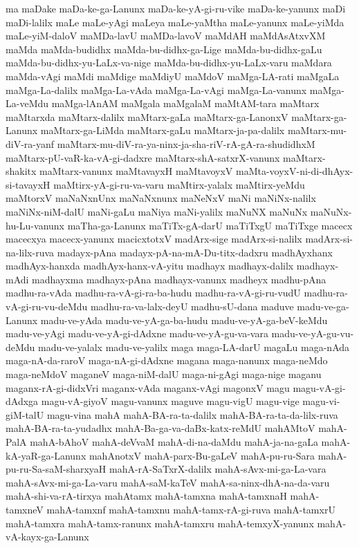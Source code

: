 {ma
maDake
maDa-ke-ga-Lanunx
maDa-ke-yA-gi-ru-vike
maDa-ke-yanunx
maDi
maDi-lalilx
maLe
maLe-yAgi
maLeya
maLe-yaMtha
maLe-yanunx
maLe-yiMda
maLe-yiM-daloV
maMDa-lavU
maMDa-lavoV
maMdAH
maMdAsAtxvXM
maMda
maMda-budidhx
maMda-bu-didhx-ga-Lige
maMda-bu-didhx-gaLu
maMda-bu-didhx-yu-LaLx-va-nige
maMda-bu-didhx-yu-LaLx-varu
maMdara
maMda-vAgi
maMdi
maMdige
maMdiyU
maMdoV
maMga-LA-rati
maMgaLa
maMga-La-dalilx
maMga-La-vAda
maMga-La-vAgi
maMga-La-vanunx
maMga-La-veMdu
maMga-lAnAM
maMgala
maMgalaM
maMtAM-tara
maMtarx
maMtarxda
maMtarx-dalilx
maMtarx-gaLa
maMtarx-ga-LanonxV
maMtarx-ga-Lanunx
maMtarx-ga-LiMda
maMtarx-gaLu
maMtarx-ja-pa-dalilx
maMtarx-mu-diV-ra-yanf
maMtarx-mu-diV-ra-ya-ninx-ja-sha-riV-rA-gA-ra-shudidhxM
maMtarx-pU-vaR-ka-vA-gi-dadxre
maMtarx-shA-satxrX-vanunx
maMtarx-shakitx
maMtarx-vanunx
maMtavayxH
maMtavoyxV
maMta-voyxV-ni-di-dhAyx-si-tavayxH
maMtirx-yA-gi-ru-va-varu
maMtirx-yalalx
maMtirx-yeMdu
maMtorxV
maNaNxnUnx
maNaNxnunx
maNeNxV
maNi
maNiNx-nalilx
maNiNx-niM-dalU
maNi-gaLu
maNiya
maNi-yalilx
maNuNX
maNuNx
maNuNx-hu-Lu-vanunx
maTha-ga-Lanunx
maTiTx-gA-darU
maTiTxgU
maTiTxge
macecx
macecxya
macecx-yanunx
macicxtotxV
madArx-sige
madArx-si-nalilx
madArx-si-na-lilx-ruva
madayx-pAna
madayx-pA-na-mA-Du-titx-dadxru
madhAyxhanx
madhAyx-hanxda
madhAyx-hanx-vA-yitu
madhayx
madhayx-dalilx
madhayx-mAdi
madhayxma
madhayx-pAna
madhayx-vanunx
madheyx
madhu-pAna
madhu-ra-vAda
madhu-ra-vA-gi-ra-ba-hudu
madhu-ra-vA-gi-ru-vudU
madhu-ra-vA-gi-ru-vu-deMdu
madhu-ra-va-lalx-deyU
madhu-sU-dana
maduve
madu-ve-ga-Lanunx
madu-ve-yAda
madu-ve-yA-ga-ba-hudu
madu-ve-yA-ga-beV-keMdu
madu-ve-yAgi
madu-ve-yA-gi-dAdxne
madu-ve-yA-gu-va-vara
madu-ve-yA-gu-vu-deMdu
madu-ve-yalalx
madu-ve-yalilx
maga
maga-LA-darU
magaLu
maga-nAda
maga-nA-da-raroV
maga-nA-gi-dAdxne
magana
maga-nanunx
maga-neMdo
maga-neMdoV
maganeV
maga-niM-dalU
maga-ni-gAgi
maga-nige
maganu
maganx-rA-gi-didxVri
maganx-vAda
maganx-vAgi
magonxV
magu
magu-vA-gi-dAdxga
magu-vA-giyoV
magu-vanunx
maguve
magu-vigU
magu-vige
magu-vi-giM-talU
magu-vina
mahA
mahA-BA-ra-ta-dalilx
mahA-BA-ra-ta-da-lilx-ruva
mahA-BA-ra-ta-yudadhx
mahA-Ba-ga-va-daBx-katx-reMdU
mahAMtoV
mahA-PalA
mahA-bAhoV
mahA-deVvaM
mahA-di-na-daMdu
mahA-ja-na-gaLa
mahA-kA-yaR-ga-Lanunx
mahAnotxV
mahA-parx-Bu-gaLeV
mahA-pu-ru-Sara
mahA-pu-ru-Sa-saM-sharxyaH
mahA-rA-SaTxrX-dalilx
mahA-sAvx-mi-ga-La-vara
mahA-sAvx-mi-ga-La-varu
mahA-saM-kaTeV
mahA-sa-ninx-dhA-na-da-varu
mahA-shi-va-rA-tirxya
mahAtamx
mahA-tamxna
mahA-tamxnaH
mahA-tamxneV
mahA-tamxnf
mahA-tamxnu
mahA-tamx-rA-gi-ruva
mahA-tamxrU
mahA-tamxra
mahA-tamx-ranunx
mahA-tamxru
mahA-temxyX-yanunx
mahA-vA-kayx-ga-Lanunx
}
